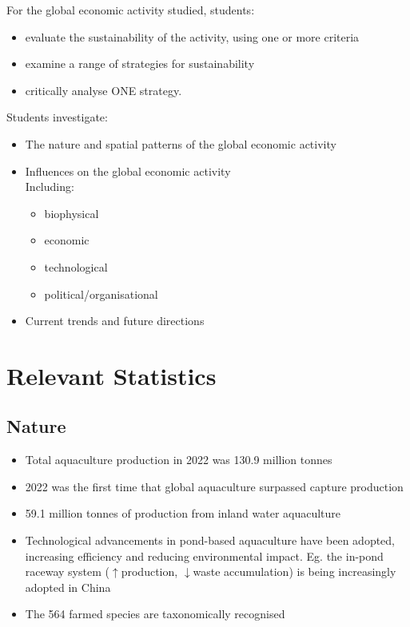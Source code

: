 	For the global economic activity studied, students:
	\begin{itemize}
		\item evaluate the sustainability of the activity, using one or more criteria
		\item examine a range of strategies for sustainability
		\item critically analyse ONE strategy.
	\end{itemize}
	Students investigate:
	\begin{itemize}
		\item The nature and spatial patterns of the global economic activity
		\item Influences on the global economic activity \\ Including:
		\begin{itemize}
			\item biophysical
			\item economic
			\item technological
			\item political/organisational
		\end{itemize}
		\item Current trends and future directions
	\end{itemize}

\section{Relevant Statistics}
	\subsection{Nature}
		\begin{itemize}
			\item Total aquaculture production in 2022 was 130.9 million tonnes
			\item 2022 was the first time that global aquaculture surpassed capture production
			\item 59.1 million tonnes of production from inland water aquaculture
			\item Technological advancements in pond-based aquaculture have been adopted, increasing efficiency and reducing environmental impact. Eg. the in-pond raceway system ($\uparrow$production, $\downarrow$waste accumulation) is being increasingly adopted in China
			\item The 564 farmed species are taxonomically recognised 
		\end{itemize}
		
